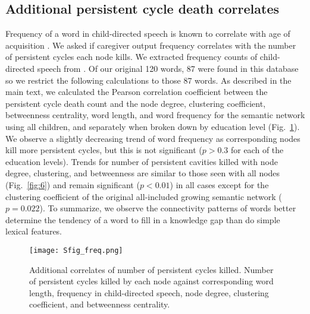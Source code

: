 \documentclass{article}
\begin{document}
\subsection*{Additional persistent cycle death correlates}

Frequency of a word in child-directed speech is known to correlate with age of acquisition
\cite{goodman2008does}. We asked if caregiver output frequency correlates with the number of persistent cycles each node kills. We extracted frequency counts of child-directed speech from \cite{macwhinney2009childes,li2000acquisition,goodman2008does}. Of our original 120 words, 87 were found in this database so we restrict the following calculations to those 87 words. As described in the main text, we calculated the Pearson correlation coefficient between the persistent cycle death count and the node degree, clustering coefficient, betweenness centrality, word length, and word frequency for the semantic network using all children, and separately when broken down by education level (Fig.~\ref{fig:app_corr}). We observe a slightly decreasing trend of word frequency as corresponding nodes kill more persistent cycles, but this is not significant ($p > 0.3$ for each of the education levels). Trends for number of persistent cavities killed with node degree, clustering, and betweenness are similar to those seen with all nodes (Fig.~\ref{fig:6}) and remain significant ($p<0.01$) in all cases except for the clustering coefficient of the original all-included growing semantic network ($p = 0.022$). To summarize, we observe the connectivity patterns of words better determine the tendency of a word to fill in a knowledge gap than do simple lexical features.


\begin{figure}
	\centering
	\texttt{[image: Sfig\_freq.png]}
	\caption{Additional correlates of number of persistent cycles killed.  Number of persistent cycles killed by each node against corresponding word length, frequency in child-directed speech, node degree, clustering coefficient, and betweenness centrality.}
	\label{fig:app_corr}
\end{figure}
\end{document}
